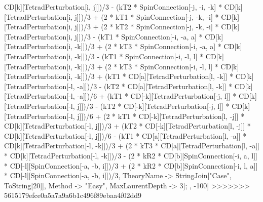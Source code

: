 CD[k][TetradPerturbation[i, j]])/3 - (kT2 * SpinConnection[-j, -i, -k] * CD[k][TetradPerturbation[i, j]])/3 + (2 * kT1 * SpinConnection[-j, -k, -i] * CD[k][TetradPerturbation[i, j]])/3 + (2 * kT2 * SpinConnection[-j, -k, -i] * CD[k][TetradPerturbation[i, j]])/3 - (kT1 * SpinConnection[-i, -a, a] * CD[k][TetradPerturbation[i, -k]])/3 + (2 * kT3 * SpinConnection[-i, -a, a] * CD[k][TetradPerturbation[i, -k]])/3 - (kT1 * SpinConnection[-i, -l, l] * CD[k][TetradPerturbation[i, -k]])/3 + (2 * kT3 * SpinConnection[-i, -l, l] * CD[k][TetradPerturbation[i, -k]])/3 + (kT1 * CD[a][TetradPerturbation[l, -k]] * CD[k][TetradPerturbation[-l, -a]])/3 - (kT2 * CD[a][TetradPerturbation[l, -k]] * CD[k][TetradPerturbation[-l, -a]])/6 + (kT1 * CD[-k][TetradPerturbation[-j, l]] * CD[k][TetradPerturbation[-l, j]])/3 - (kT2 * CD[-k][TetradPerturbation[-j, l]] * CD[k][TetradPerturbation[-l, j]])/6 + (2 * kT1 * CD[-k][TetradPerturbation[l, -j]] * CD[k][TetradPerturbation[-l, j]])/3 + (kT2 * CD[-k][TetradPerturbation[l, -j]] * CD[k][TetradPerturbation[-l, j]])/6 - (kT1 * CD[a][TetradPerturbation[l, -a]] * CD[k][TetradPerturbation[-l, -k]])/3 + (2 * kT3 * CD[a][TetradPerturbation[l, -a]] * CD[k][TetradPerturbation[-l, -k]])/3 - (2 * kR2 * CD[b][SpinConnection[-i, a, l]] * CD[-l][SpinConnection[-a, -b, i]])/3 + (2 * kR2 * CD[b][SpinConnection[-i, l, a]] * CD[-l][SpinConnection[-a, -b, i]])/3, TheoryName -> StringJoin["Case", ToString[20]], Method -> "Easy", MaxLaurentDepth -> 3]; , -100]
>>>>>>> 5615179efce0a5a7a9a6b1c496f89ebaa4f02dd9
